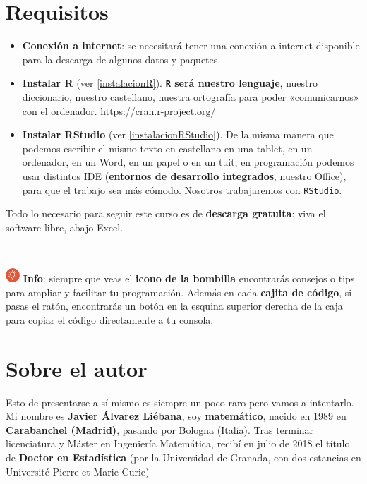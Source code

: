 \documentclass[11pt,]{book}
\begin{document}
\hypertarget{requisitos}{%
\section*{Requisitos}\label{requisitos}}


\begin{itemize}
\item
  \textbf{Conexión a internet}: se necesitará tener una conexión a internet disponible para la descarga de algunos datos y paquetes.
\item
  \textbf{Instalar R} (ver \ref{instalacionR}). \textbf{\texttt{R} será nuestro lenguaje}, nuestro diccionario, nuestro castellano, nuestra ortografía para poder «comunicarnos» con el ordenador. \url{https://cran.r-project.org/}
\item
  \textbf{Instalar RStudio} (ver \ref{instalacionRStudio}). De la misma manera que podemos escribir el mismo texto en castellano en una tablet, en un ordenador, en un Word, en un papel o en un tuit, en programación podemos usar distintos IDE (\textbf{entornos de desarrollo integrados}, nuestro Office), para que el trabajo sea más cómodo. Nosotros trabajaremos con \texttt{RStudio}.
\end{itemize}

Todo lo necesario para seguir este curso es de \textbf{descarga gratuita}: viva el software libre, abajo Excel.

~

\includegraphics[width=0.04\textwidth,height=\textheight]{img/logo_info.png} \textbf{Info}: siempre que veas el \textbf{icono de la bombilla} encontrarás consejos o tips para ampliar y facilitar tu programación. Además en cada \textbf{cajita de código}, si pasas el ratón, encontrarás un botón en la esquina superior derecha de la caja para copiar el código directamente a tu consola.

\hypertarget{sobre-el-autor}{%
\section*{Sobre el autor}\label{sobre-el-autor}}


Esto de presentarse a sí mismo es siempre un poco raro pero vamos a intentarlo. Mi nombre es \textbf{Javier Álvarez Liébana}, soy \textbf{matemático}, nacido en 1989 en \textbf{Carabanchel (Madrid)}, pasando por Bologna (Italia). Tras terminar licenciatura y Máster en Ingeniería Matemática, recibí en julio de 2018 el título de \textbf{Doctor en Estadística} (por la Universidad de Granada, con dos estancias en Université Pierre et Marie Curie)
\end{document}
